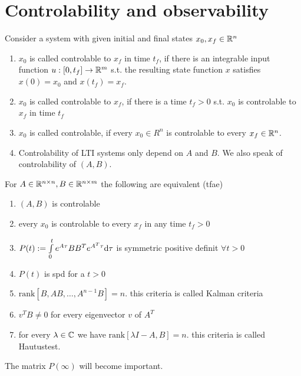 \section{Controlability and observability}

\begin{defi}
	Consider a system with given initial and final states $x_0, x_f \in \mathbb{R}^n$
	\begin{enumerate}
		\item $x_0$ is called controlable to $x_f$ in time $t_f$, if there is an integrable input function $u:[0,t_f] \rightarrow \mathbb{R}^m$ s.t. the resulting state function $x$ satisfies $x(0)=x_0$ and $x(t_f)=x_f$. 
		\item $x_0$ is called controlable to $x_f$, if there is a time $t_f>0$ s.t. $x_0$ is controlable to $x_f$ in time $t_f$
		\item $x_0$ is called controlable, if every $x_0 \in R^n$ is controlable to every $x_f \in \mathbb{R}^n$.
		\item Controlability of LTI systems only depend on $A$ and $B$. We also speak of controlability of $(A,B)$. 
	\end{enumerate}	
\end{defi}

\begin{thm}
	For $A \in \mathbb{R}^{n \times n}, B \in \mathbb{R}^{n \times m } $ the following are equivalent (tfae)
	\begin{enumerate}
		\item $(A,B)$ is controlable 
		\item every $x_0$ is controlable to every $x_f$ in any time $t_f>0$
		\item $P(t):=\int\limits_0^t e^{A \tau} B B^T e^{A^T \tau} \mathrm{d} \tau $ is symmetric positive definit $\forall t>0$
		\item $P(t)$ is spd for a $t>0$
		\item $\text{rank} [B,AB, \dots, A^{n-1}B]=n$. this criteria is called Kalman criteria
		\item $v^TB \neq 0$ for every eigenvector $v$ of $A^T$
		\item for every $\lambda \in \mathbb{C}$ we have $\text{rank}[\lambda I - A,B]=n$. this criteria is called Hautustest.  
	\end{enumerate}
\end{thm}

The matrix $P(\infty)$ will become important. 







